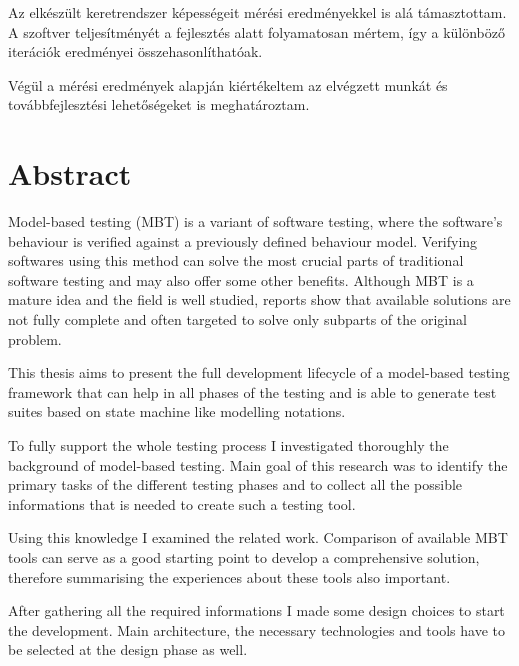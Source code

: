 Az elkészült keretrendszer képességeit mérési eredményekkel is alá támasztottam. A szoftver teljesítményét a fejlesztés alatt folyamatosan mértem, így a különböző iterációk eredményei összehasonlíthatóak.

Végül a mérési eredmények alapján kiértékeltem az elvégzett munkát és továbbfejlesztési lehetőségeket is meghatároztam.

\vfill
{}
\englishParagraph


\chapter*{Abstract}
\label{cha:abstract}

Model-based testing (MBT) is a variant of software testing, where the software's behaviour is verified against a previously defined behaviour model. Verifying softwares using this method can solve the most crucial parts of traditional software testing and may also offer some other benefits. Although MBT is a mature idea and the field is well studied, reports show that available solutions are not fully complete and often targeted to solve only subparts of the original problem.

This thesis aims to present the full development lifecycle of a model-based testing framework that can help in all phases of the testing and is able to generate test suites based on state machine like modelling notations.

To fully support the whole testing process I investigated thoroughly the background of model-based testing. Main goal of this research was to identify the primary tasks of the different testing phases and to collect all the possible informations that is needed to create such a testing tool.

Using this knowledge I examined the related work. Comparison of available MBT tools can serve as a good starting point to develop a comprehensive solution, therefore summarising the experiences about these tools also important.

After gathering all the required informations I made some design choices to start the development. Main architecture, the necessary technologies and tools have to be selected at the design phase as well.

